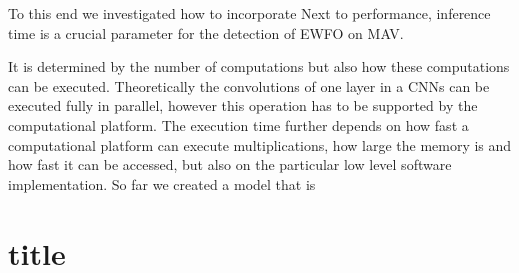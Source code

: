	To this end we investigated how to incorporate 
	Next to performance, inference time is a crucial parameter for the detection of \ac{EWFO} on \ac{MAV}. 
	
	 It is determined by the number of computations but also how these computations can be executed. Theoretically the convolutions of one layer in a \acp{CNN} can be executed fully in parallel, however this operation has to be supported by the computational platform. The execution time further depends on how fast a computational platform can execute multiplications, how large the memory is and how fast it can be accessed, but also on the particular low level software implementation. So far we created a model that is 
	
	\section{title}